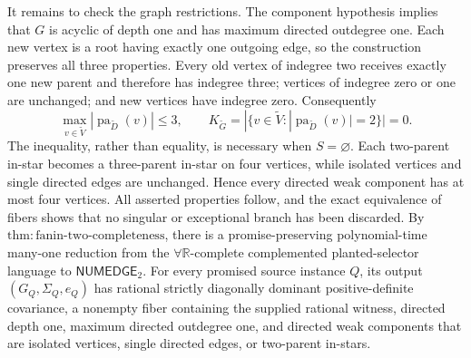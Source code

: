 It remains to check the graph restrictions. The component hypothesis implies that \(G\) is acyclic of depth one and has maximum directed outdegree one. Each new vertex is a root having exactly one outgoing edge, so the construction preserves all three properties. Every old vertex of indegree two receives exactly one new parent and therefore has indegree three; vertices of indegree zero or one are unchanged; and new vertices have indegree zero. Consequently
\[
\max_{v\in\widetilde V}|\operatorname{pa}_{\widetilde D}(v)|\le3,
\qquad
K_{\widetilde G}
=|\{v\in\widetilde V:|\operatorname{pa}_{\widetilde D}(v)|=2\}|=0.
\]
The inequality, rather than equality, is necessary when \(S=\varnothing\). Each two-parent in-star becomes a three-parent in-star on four vertices, while isolated vertices and single directed edges are unchanged. Hence every directed weak component has at most four vertices. All asserted properties follow, and the exact equivalence of fibers shows that no singular or exceptional branch has been discarded.
By \(\mathrm{thm:fanin\mbox{-}two\mbox{-}completeness}\), there is a promise-preserving polynomial-time many-one reduction from the \(\forall\mathbb R\)-complete complemented planted-selector language to \(\mathsf{NUMEDGE}_2\). For every promised source instance \(Q\), its output \((G_Q,\Sigma_Q,e_Q)\) has rational strictly diagonally dominant positive-definite covariance, a nonempty fiber containing the supplied rational witness, directed depth one, maximum directed outdegree one, and directed weak components that are isolated vertices, single directed edges, or two-parent in-stars.

